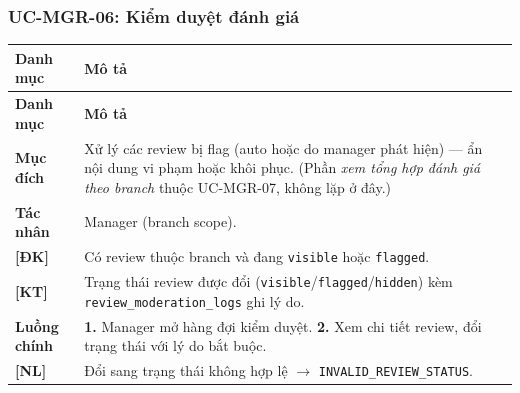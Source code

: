 \subsubsection{UC-MGR-06: Kiểm duyệt đánh giá}
\begingroup
\renewcommand{\arraystretch}{1.3}
\begin{longtable}{|>{\centering\arraybackslash}m{3cm}|>{\raggedright\arraybackslash}m{12cm}|}
\hline
\textbf{Danh mục} & \textbf{Mô tả} \\ \hline
\endfirsthead
\hline
\textbf{Danh mục} & \textbf{Mô tả} \\ \hline
\endhead
\hline
\endfoot
\textbf{Mục đích} & Xử lý các review bị flag (auto hoặc do manager phát hiện) — ẩn nội dung vi phạm hoặc khôi phục. (Phần \emph{xem tổng hợp đánh giá theo branch} thuộc UC-MGR-07, không lặp ở đây.) \\
\hline
\textbf{Tác nhân} & Manager (branch scope). \\
\hline
\textbf{[ĐK]} & Có review thuộc branch và đang \texttt{visible} hoặc \texttt{flagged}. \\
\hline
\textbf{[KT]} & Trạng thái review được đổi (\texttt{visible}/\texttt{flagged}/\texttt{hidden}) kèm \texttt{review\_moderation\_logs} ghi lý do. \\
\hline
\textbf{Luồng chính} & \textbf{1.} Manager mở hàng đợi kiểm duyệt. \textbf{2.} Xem chi tiết review, đổi trạng thái với lý do bắt buộc. \\
\hline
\textbf{[NL]} & Đổi sang trạng thái không hợp lệ $\rightarrow$ \texttt{INVALID\_REVIEW\_STATUS}. \\
\hline
\end{longtable}
\endgroup

